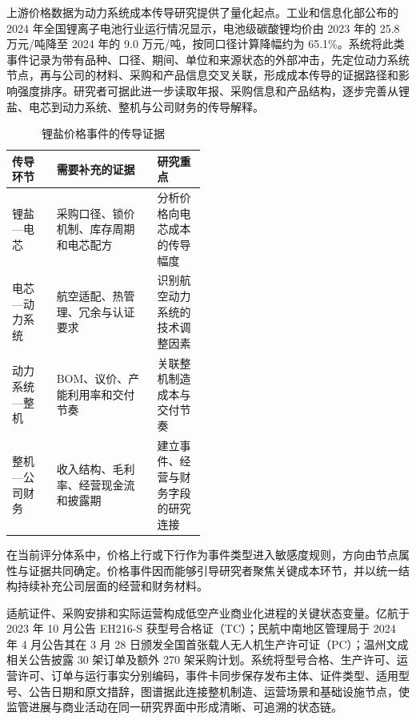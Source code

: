 上游价格数据为动力系统成本传导研究提供了量化起点。工业和信息化部公布的 2024 年全国锂离子电池行业运行情况显示，电池级碳酸锂均价由 2023 年的 25.8 万元/吨降至 2024 年的 9.0 万元/吨，按同口径计算降幅约为 65.1\%\cite{wty-miit-lithium}。系统将此类事件记录为带有品种、口径、期间、单位和来源状态的外部冲击，先定位动力系统节点，再与公司的材料、采购和产品信息交叉关联，形成成本传导的证据路径和影响强度排序。研究者可据此进一步读取年报、采购信息和产品结构，逐步完善从锂盐、电芯到动力系统、整机与公司财务的传导解释。

\begin{table}[!htbp]
\centering
\caption{锂盐价格事件的传导证据}
\label{tab:wty-price-case}
\small
\begin{tabularx}{\linewidth}{p{0.23\linewidth}X p{0.25\linewidth}}
\toprule
传导环节 & 需要补充的证据 & 研究重点 \\
\midrule
锂盐—电芯 & 采购口径、锁价机制、库存周期和电芯配方 & 分析价格向电芯成本的传导幅度 \\
电芯—动力系统 & 航空适配、热管理、冗余与认证要求 & 识别航空动力系统的技术调整因素 \\
动力系统—整机 & BOM、议价、产能利用率和交付节奏 & 关联整机制造成本与交付节奏 \\
整机—公司财务 & 收入结构、毛利率、经营现金流和披露期 & 建立事件、经营与财务字段的研究连接 \\
\bottomrule
\end{tabularx}
\end{table}

在当前评分体系中，价格上行或下行作为事件类型进入敏感度规则，方向由节点属性与证据共同确定。价格事件因而能够引导研究者聚焦关键成本环节，并以统一结构持续补充公司层面的经营和财务材料。


适航证件、采购安排和实际运营构成低空产业商业化进程的关键状态变量。亿航于 2023 年 10 月公告 EH216-S 获型号合格证（TC）\cite{wty-ehang-tc}；民航中南地区管理局于 2024 年 4 月公告其在 3 月 28 日颁发全国首张载人无人机生产许可证（PC）\cite{wty-caac-pc}；温州文成相关公告披露 30 架订单及额外 270 架采购计划\cite{wty-ehang-wencheng}。系统将型号合格、生产许可、运营许可、订单与运行事实分别编码，事件卡同步保存发布主体、证件类型、适用型号、公告日期和原文措辞，图谱据此连接整机制造、运营场景和基础设施节点，使监管进展与商业活动在同一研究界面中形成清晰、可追溯的状态链。

